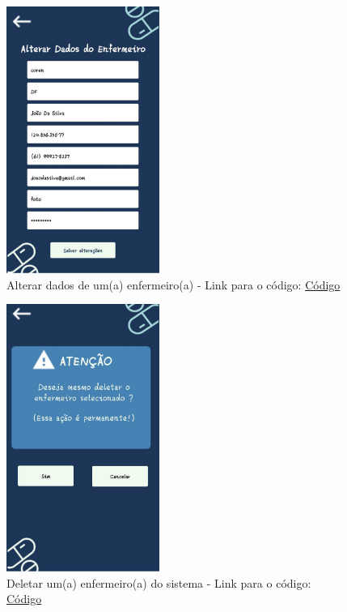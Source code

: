 \begin{apendicesenv}
\begin{figure}[H]
    \centering
    \includegraphics[width=5cm]{figuras/Software_Telas_Frontend/front_AlterarDadosEnfermeiro.jpg}
    \caption{Alterar dados de um(a) enfermeiro(a) - Link para o código: \href{https://github.com/PillWatcher/pillwatcher-dpf-service/blob/dev/components/alterarDadosEnfermeiro.js}{Código}}
    \label{fig:alterar_dados_enfermeiro}
\end{figure}

\begin{figure}[H]
    \centering
    \includegraphics[width=5cm]{figuras/Software_Telas_Frontend/front_DeletarEnfermeiro.jpg}
    \caption{Deletar um(a) enfermeiro(a) do sistema - Link para o código: \href{https://github.com/PillWatcher/pillwatcher-dpf-service/blob/dev/components/deletarEnfermeiro.js}{Código}}
    \label{fig:deletar_enfermeiro}
\end{figure}


\end{apendicesenv}
